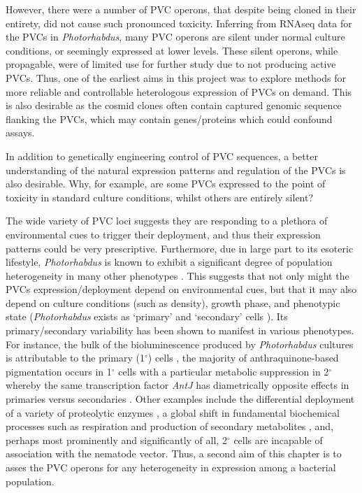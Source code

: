 However, there were a number of PVC operons, that despite being cloned in their entirety, did not cause such pronounced toxicity. Inferring from RNAseq data for the PVCs in \emph{Photorhabdus}, many PVC operons are silent under normal culture conditions, or seemingly expressed at lower levels. These silent operons, while propagable, were of limited use for further study due to not producing active PVCs. Thus, one of the earliest aims in this project was to explore methods for more reliable and controllable heterologous expression of PVCs on demand. This is also desirable as the cosmid clones often contain captured genomic sequence flanking the PVCs, which may contain genes/proteins which could confound assays.

In addition to genetically engineering control of PVC sequences, a better understanding of the natural expression patterns and regulation of the PVCs is also desirable. Why, for example, are some PVCs expressed to the point of toxicity in standard culture conditions, whilst others are entirely silent?

The wide variety of PVC loci suggests they are responding to a plethora of environmental cues to trigger their deployment, and thus their expression patterns could be very prescriptive. Furthermore, due in large part to its esoteric lifestyle, \emph{Photorhabdus} is known to exhibit a significant degree of population heterogeneity in many other phenotypes \citep{Langer2017, Heinrich2016}. This suggests that not only might the PVCs expression/deployment depend on environmental cues, but that it may also depend on culture conditions (such as density), growth phase, and phenotypic state (\emph{Photorhabdus} exists as `primary' and `secondary' cells \citep{Boemare1988}). Its primary/secondary variability has been shown to manifest in various phenotypes. For instance, the bulk of the bioluminescence produced by \emph{Photorhabdus} cultures is attributable to the primary (1$^{\circ}$) cells \citep{Boemare1988, AKHURST1980}, the majority of anthraquinone-based pigmentation occurs in 1$^{\circ}$ cells  with a particular metabolic suppression in 2$^{\circ}$ whereby the same transcription factor \emph{AntJ} has diametrically opposite effects in primaries versus secondaries \citep{Heinrich2016, Langer2017}. Other examples include the differential deployment of a variety of proteolytic enzymes \citep{Marokhazi2004}, a global shift in fundamental biochemical processes such as respiration \citep{Smigielski1994} and production of secondary metabolites \citep{Turlin2006}, and, perhaps most prominently and significantly of all, 2$^{\circ}$ cells are incapable of association with the nematode vector. Thus, a second aim of this chapter is to asses the PVC operons for any heterogeneity in expression among a bacterial population.


